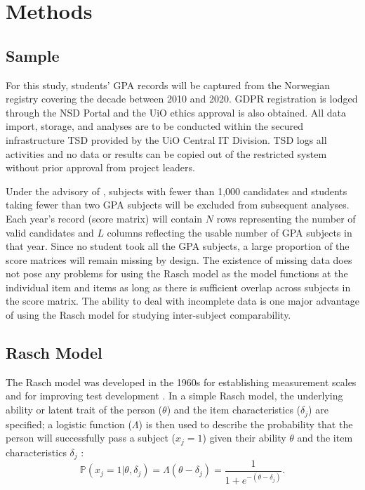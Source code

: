 \documentclass[
    a4paper,            %
    11pt,               %
    stu,                %
    donotrepeattitle,   %
    noextraspace,       %
    floatsintext,       %
    biblatex,           %
    colorlinks=true,        %
    linkcolor=red,          %
    anchorcolor=black,      %
    citecolor=blue,         %
    urlcolor=blue,          %
    bookmarks=true,         %
    bookmarksopen=false,    %
    bookmarksnumbered=true  %
]{apa7}
\newcommand{\p}[1]{\mathbb{P}\left(#1\right)}
\begin{document}
\section{Methods}

\subsection{Sample}

For this study, students' GPA records will be captured from the Norwegian registry covering the decade between 2010 and 2020. GDPR registration is lodged through the NSD Portal and the UiO ethics approval is also obtained. All data import, storage, and analyses are to be conducted within the secured infrastructure TSD provided by the UiO Central IT Division. TSD logs all activities and no data or results can be copied out of the restricted system without prior approval from project leaders.

Under the advisory of \textcite{he:2015}, subjects with fewer than 1,000 candidates and students taking fewer than two GPA subjects will be excluded from subsequent analyses. Each year's record (score matrix) will contain $N$ rows representing the number of valid candidates and $L$ columns reflecting the usable number of GPA subjects in that year. Since no student took all the GPA subjects, a large proportion of the score matrices will remain missing by design. The existence of missing data does not pose any problems for using the Rasch model as the model functions at the individual item and items as long as there is sufficient overlap across subjects in the score matrix. The ability to deal with incomplete data is one major advantage of using the Rasch model for studying inter-subject comparability.

\subsection{Rasch Model}

The Rasch model was developed in the 1960s for establishing measurement scales and for improving test development \parencite{rasch:1980}. In a simple Rasch model, the underlying ability or latent trait of the person ($\theta$) and the item characteristics ($\delta_j$) are specified; a logistic function ($\Lambda$) is then used to describe the probability that the person will successfully pass a subject ($x_j=1$) given their ability $\theta$ and the item characteristics $\delta_j$ \parencite{deayala:2009}:
\begin{equation}\label{eq:di}
    \p{x_j = 1 | \theta, \delta_j} = \Lambda(\theta - \delta_j) = \frac{1}{1 + e^{- \left( \theta - \delta_j \right) } }.
\end{equation}
\end{document}
